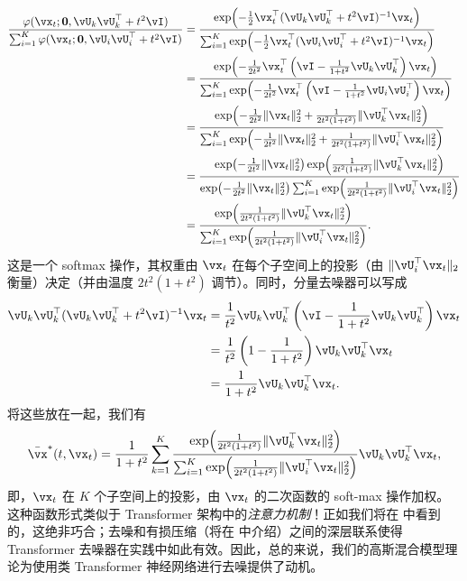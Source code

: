 \documentclass[../../book-main_zh.tex]{subfiles}
\begin{document}
\begin{align}
	\frac{\phi(\vx_{t} ; \vzero, \vU_{k}\vU_{k}^{\top} + t^{2}\vI)}{\sum_{i
	= 1}^{K}\phi(\vx_{t} ; \vzero, \vU_{i}\vU_{i}^{\top} + t^{2}\vI)} 
	&= \frac{\exp\rp{-\frac{1}{2}\vx_{t}^{\top}(\vU_{k}\vU_{k}^{\top} + t^{2}\vI)^{-1}\vx_{t}}}{\sum_{i = 1}^{K}\exp\rp{-\frac{1}{2}\vx_{t}^{\top}(\vU_{i}\vU_{i}^{\top} + t^{2}\vI)^{-1}\vx_{t}}} \\
	&= \frac{\exp\rp{-\frac{1}{2t^{2}}\vx_{t}^{\top}\bp{\vI - \frac{1}{1 + t^{2}}\vU_{k}\vU_{k}^{\top}}\vx_{t}}}{\sum_{i = 1}^{K}\exp\rp{-\frac{1}{2t^{2}}\vx_{t}^{\top}\bp{\vI - \frac{1}{1 + t^{2}}\vU_{i}\vU_{i}^{\top}}\vx_{t}}} \\
	&= \frac{\exp\rp{-\frac{1}{2t^{2}}\norm{\vx_{t}}_{2}^{2} + \frac{1}{2t^{2}(1 + t^{2})}\norm{\vU_{k}^{\top}\vx_{t}}_{2}^{2}}}{\sum_{i = 1}^{K}\exp\rp{-\frac{1}{2t^{2}}\norm{\vx_{t}}_{2}^{2} + \frac{1}{2t^{2}(1 + t^{2})}\norm{\vU_{i}^{\top}\vx_{t}}_{2}^{2}}} \\
	&= \frac{\exp\rp{-\frac{1}{2t^{2}}\norm{\vx_{t}}_{2}^{2}}\exp\rp{\frac{1}{2t^{2}(1 + t^{2})}\norm{\vU_{k}^{\top}\vx_{t}}_{2}^{2}}}{\exp\rp{-\frac{1}{2t^{2}}\norm{\vx_{t}}_{2}^{2}}\sum_{i = 1}^{K}\exp\rp{\frac{1}{2t^{2}(1 + t^{2})}\norm{\vU_{i}^{\top}\vx_{t}}_{2}^{2}}} \\
	&= \frac{\exp\rp{\frac{1}{2t^{2}(1 + t^{2})}\norm{\vU_{k}^{\top}\vx_{t}}_{2}^{2}}}{\sum_{i = 1}^{K}\exp\rp{\frac{1}{2t^{2}(1 + t^{2})}\norm{\vU_{i}^{\top}\vx_{t}}_{2}^{2}}}.
\end{align}
这是一个 softmax 操作，其权重由 \(\vx_{t}\) 在每个子空间上的投影（由 \(\norm{\vU_{i}^{\top}\vx_{t}}_{2}\) 衡量）决定（并由温度 \(2t^{2}(1 + t^{2})\) 调节）。同时，分量去噪器可以写成
\begin{align}
	\vU_{k}\vU_{k}^{\top}(\vU_{k}\vU_{k}^{\top} + t^{2}\vI)^{-1}\vx_{t} 
	&= \frac{1}{t^{2}}\vU_{k}\vU_{k}^{\top}\bp{\vI - \frac{1}{1 + t^{2}}\vU_{k}\vU_{k}^{\top}}\vx_{t} \\
	&= \frac{1}{t^{2}}\bp{1 - \frac{1}{1 + t^{2}}}\vU_{k}\vU_{k}^{\top}\vx_{t} \\
	&= \frac{1}{1 + t^{2}}\vU_{k}\vU_{k}^{\top}\vx_{t}.
\end{align}
将这些放在一起，我们有
\begin{equation}\label{eq:gmm_lowrank_denoiser}
	\bar{\vx}^{\ast}(t, \vx_{t}) = \frac{1}{1 + t^{2}}\sum_{k = 1}^{K}\frac{\exp\rp{\frac{1}{2t^{2}(1 + t^{2})}\norm{\vU_{k}^{\top}\vx_{t}}_{2}^{2}}}{\sum_{i = 1}^{K}\exp\rp{\frac{1}{2t^{2}(1 + t^{2})}\norm{\vU_{i}^{\top}\vx_{t}}_{2}^{2}}}\vU_{k}\vU_{k}^{\top}\vx_{t},
\end{equation}
即，\(\vx_{t}\) 在 \(K\) 个子空间上的投影，由 \(\vx_{t}\) 的二次函数的 soft-max 操作加权。这种函数形式类似于 Transformer 架构中的\textit{注意力机制}！正如我们将在  中看到的，这绝非巧合；去噪和有损压缩（将在  中介绍）之间的深层联系使得 Transformer 去噪器在实践中如此有效。因此，总的来说，我们的高斯混合模型理论为使用类 Transformer 神经网络进行去噪提供了动机。
\end{document}
